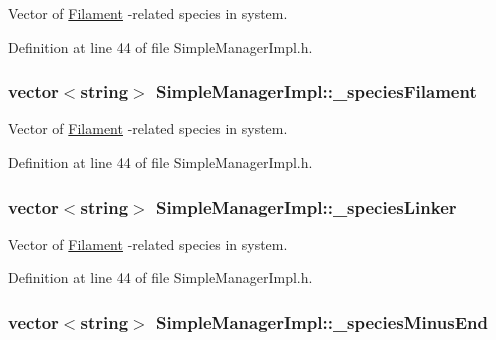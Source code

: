 Vector of \hyperlink{classFilament}{Filament} -\/related species in system. 



Definition at line 44 of file Simple\+Manager\+Impl.\+h.

\hypertarget{classSimpleManagerImpl_a6842452647356333fa3a8dfc9daad925}{
\subsubsection[{\+\_\+species\+Filament}]{\setlength{\rightskip}{0pt plus 5cm}vector$<$string$>$ Simple\+Manager\+Impl\+::\+\_\+species\+Filament\hspace{0.3cm}{\ttfamily [private]}}}\label{classSimpleManagerImpl_a6842452647356333fa3a8dfc9daad925}


Vector of \hyperlink{classFilament}{Filament} -\/related species in system. 



Definition at line 44 of file Simple\+Manager\+Impl.\+h.

\hypertarget{classSimpleManagerImpl_ac5bb2d96109696dcd63109154f88c6be}{
\subsubsection[{\+\_\+species\+Linker}]{\setlength{\rightskip}{0pt plus 5cm}vector$<$string$>$ Simple\+Manager\+Impl\+::\+\_\+species\+Linker\hspace{0.3cm}{\ttfamily [private]}}}\label{classSimpleManagerImpl_ac5bb2d96109696dcd63109154f88c6be}


Vector of \hyperlink{classFilament}{Filament} -\/related species in system. 



Definition at line 44 of file Simple\+Manager\+Impl.\+h.

\hypertarget{classSimpleManagerImpl_a07794aeec638f61758d22f7ba3b2d5b4}{
\subsubsection[{\+\_\+species\+Minus\+End}]{\setlength{\rightskip}{0pt plus 5cm}vector$<$string$>$ Simple\+Manager\+Impl\+::\+\_\+species\+Minus\+End\hspace{0.3cm}{\ttfamily [private]}}}\label{classSimpleManagerImpl_a07794aeec638f61758d22f7ba3b2d5b4}


